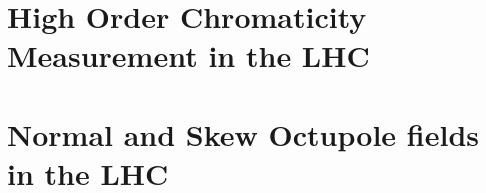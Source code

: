 \documentclass[openright,twoside,headsepline,bibliography=totoc]{scrbook}
\date{}
\begin{document}
\frontmatter  %














\setcounter{tocdepth}{3}
\tableofcontents





\mainmatter







\chapter{High Order Chromaticity Measurement in the LHC}
\thumbforchapter{}
\chaptertoc{}

\chapter{Normal and Skew Octupole fields in the LHC}
\thumbforchapter{}
\chaptertoc{}

\end{document}
